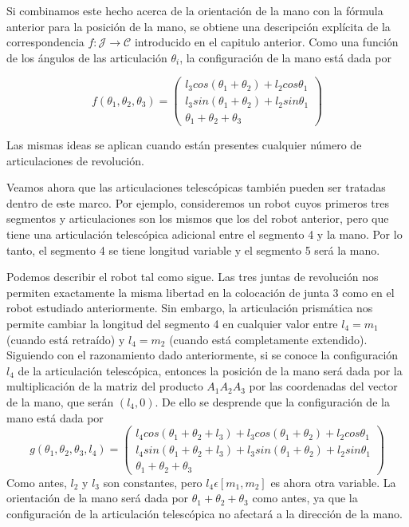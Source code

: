 Si combinamos este hecho acerca de la orientación de la mano con la fórmula anterior para la posición de la mano, se obtiene una descripción explícita de la correspondencia $f: \mathcal{J} \longrightarrow \mathcal{C}$ introducido en el capitulo anterior. Como una función de los ángulos de las articulación $\theta_{i}$, la configuración de la mano está dada por

\begin{equation} \label{eqf} 
f(\theta_{1}, \theta_{2}, \theta_{3})= 
\begin{pmatrix} 
l_{3}cos(\theta_{1} + \theta_{2})+l_{2}cos\theta_{1}\\
l_{3}sin(\theta_{1} + \theta_{2})+l_{2}sin\theta_{1}\\
\theta_{1} + \theta_{2} + \theta_{3}
\end{pmatrix}
\end{equation}

Las mismas ideas se aplican cuando están presentes cualquier número de articulaciones de revolución.


Veamos ahora que las articulaciones telescópicas también pueden ser tratadas dentro de este marco. Por ejemplo, consideremos un robot cuyos primeros tres segmentos y articulaciones son los mismos que los del robot anterior, pero que tiene una articulación telescópica adicional entre el segmento 4 y la mano. Por lo tanto, el segmento 4 se tiene longitud variable y el segmento 5 será la mano.

Podemos describir el robot tal como sigue. Las tres juntas de revolución nos permiten exactamente la misma libertad en la colocación de junta 3 como en el robot estudiado anteriormente. Sin embargo, la articulación prismática nos permite cambiar la longitud del segmento 4 en cualquier valor entre $l_{4} = m_{1}$ (cuando está retraído) y $l_{4} = m_{2}$ (cuando está completamente extendido). Siguiendo con el razonamiento dado anteriormente, si se conoce la configuración $l_{4}$ de la articulación telescópica, entonces la posición de la mano será dada por la multiplicación de la matriz del producto $A_{1}A_{2}A_{3}$ por las coordenadas del vector de la mano, que serán $(l_{4},0)$. De ello se desprende que la configuración de la mano está dada por
\begin{equation} \label{eqg}
g(\theta_{1},\theta_{2},\theta_{3},l_{4})= 
\begin{pmatrix} 
l_{4}cos(\theta_{1} + \theta_{2} + l_{3}) + l_{3}cos(\theta_{1} + \theta_{2}) + l_{2}cos\theta_{1}\\
l_{4}sin(\theta_{1} + \theta_{2} + l_{3}) + l_{3}sin(\theta_{1} + \theta_{2}) + l_{2}sin\theta_{1}\\
\theta_{1} + \theta_{2} + \theta_{3}
\end{pmatrix}
\end{equation}
Como antes, $l_{2}$ y $l_{3}$ son constantes, pero $l_{4} \epsilon \left[ m_{1},m_{2}\right]$ es ahora otra variable. La orientación de la mano será dada por $\theta_{1} + \theta_{2} + \theta_{3}$ como antes, ya que la configuración de la articulación telescópica no afectará a la dirección de la mano.

